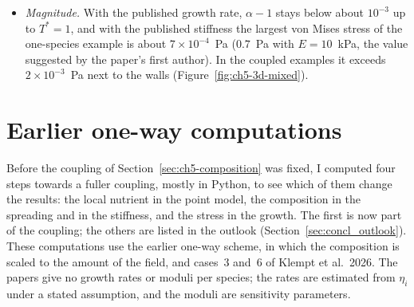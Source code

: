\begin{itemize}
      where $\nabla c=\mathbf 0$; I regularise it with
      $\|\nabla c\|^2+\varepsilon^2$, $\varepsilon^2=10^{-6}$, as the authors' implementation does with a
      small $\varepsilon$ (F. Klempt, personal communication, October 2026); $\varepsilon^2=10^{-8}$
      changes the stress by $0.1\,\%$.
\item \emph{Magnitude.} With the published growth rate, $\alpha-1$ stays below
      about $10^{-3}$ up to $T^*=1$, and with the published stiffness the
      largest von Mises stress of the one-species example is about $7\times10^{-4}$~Pa ($0.7$~Pa with
      $E=10$~kPa, the value suggested by the paper's first author). In the coupled examples it exceeds
      $2\times10^{-3}$~Pa next to the walls (Figure~\ref{fig:ch5-3d-mixed}).%
\end{itemize}

\iffalse
\section{Earlier one-way computations}
\label{sec:ch5-outlook}
\label{sec:ch5-outlook-python}

Before the coupling of Section~\ref{sec:ch5-composition} was fixed, I computed four steps towards a
fuller coupling, mostly in Python, to see which of them change the results: the local nutrient in the point
model, the composition in the spreading and in the stiffness, and the stress in the growth. The first is now
part of the coupling; the others are listed in the outlook (Section~\ref{sec:concl_outlook}). These
computations use the earlier one-way
scheme, in which the composition is scaled to the amount of the field, and cases~3 and~6 of Klempt et
al.\ 2026. The papers give no growth rates or moduli per species; the rates are estimated from
$\eta_i$ under a stated assumption, and the moduli are sensitivity parameters.

